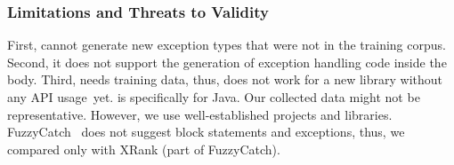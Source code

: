 
\subsubsection*{\bf Limitations and Threats to Validity}
First, {\tool} cannot generate new exception types that were not in
the training corpus. Second, it does not support the generation of
exception handling code inside the  body. Third, {\tool}
needs training data, thus, does not work for a new library without any
API usage~yet. {\tool} is specifically for Java. Our collected data
might not be representative. However, we use well-established projects
and libraries. FuzzyCatch~\cite{xrank-fse20} does not
suggest  block statements and exceptions, thus, we compared
only with XRank (part of FuzzyCatch).
